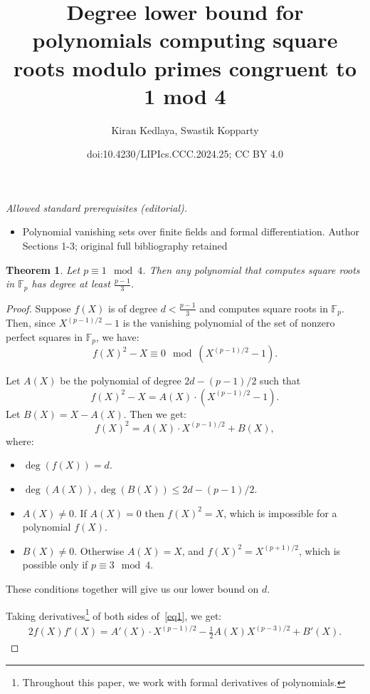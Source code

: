 \documentclass[10pt,a4paper]{article}
\title{Degree lower bound for polynomials computing square roots modulo primes congruent to 1 mod 4}
\author{Kiran Kedlaya, Swastik Kopparty}
\date{doi:10.4230/LIPIcs.CCC.2024.25; CC BY 4.0}
\newtheorem{theorem}{Theorem}[section]
\newcommand{\F}{\mathbb{F}}
\begin{document}
\maketitle
\setcounter{section}{1}
\noindent\textit{Allowed standard prerequisites (editorial).}\begin{itemize}
\item Polynomial vanishing sets over finite fields and formal differentiation. Author Sections 1-3; original full bibliography retained
\end{itemize}\medskip
\begin{theorem}
\label{thm:1mod4}
 Let $p \equiv 1 \mod 4$. Then any polynomial that computes square roots in $\F_p$ has degree at least $\frac{p-1}{3}$.
\end{theorem}

\begin{proof}
Suppose $f(X)$ is of degree $d < \frac{p-1}{3}$ and computes square roots in $\F_p$.
Then, since $X^{(p-1)/2} - 1$ is the vanishing polynomial of the set of nonzero perfect squares in $\F_p$, we have:
$$ f(X)^2 - X   \equiv 0  \mod (X^{(p-1)/2} - 1).$$

Let $A(X)$ be the polynomial of degree $2d-(p-1)/2$ such that
$$f(X)^2 - X =  A(X) \cdot (X^{(p-1)/2} - 1).$$
Let $B(X) = X - A(X)$.
Then we get:
\begin{equation}
\label{eq1}
f(X)^2 = A(X) \cdot X^{(p-1)/2}  + B(X),
\end{equation}
where:
\begin{itemize}
\item $\deg(f(X)) = d$.
 \item $\deg(A(X)), \deg(B(X)) \leq 2d - (p-1)/2$.
 \item $A(X) \neq 0$. If $A(X) = 0$ then $f(X)^2 = X$, which is impossible for a polynomial $f(X)$. 
 \item $B(X) \neq 0$. Otherwise $A(X) = X$, and $f(X)^2 = X^{(p+1)/2}$, which is possible only if $p \equiv 3 \mod 4$.
\end{itemize}

These conditions together will give us our lower bound on $d$.

Taking derivatives\footnote{Throughout this paper, we work with formal derivatives of polynomials.} of both sides of~\eqref{eq1}, we get:
\begin{align}
\label{eq2}
2f(X)f'(X) = A'(X) \cdot X^{(p-1)/2} - \frac{1}{2}A(X) X^{(p-3)/2} + B'(X).
\end{align}


\end{proof}
\end{document}
